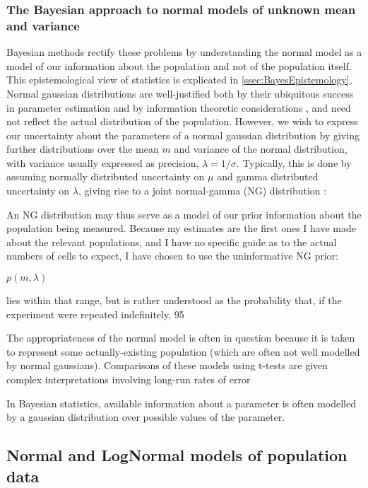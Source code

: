 \subsubsection{The Bayesian approach to normal models of unknown mean and variance}
Bayesian methods rectify these problems by understanding the normal model as a model of our information about the population and not of the population itself. This epistemological view of statistics is explicated in \autoref{ssec:BayesEpistemology}. Normal gaussian distributions are well-justified both by their ubiquitous success in parameter estimation and by information theoretic considerations \cite{Jaynes2003}, and need not reflect the actual distribution of the population. However, we wish to express our uncertainty about the parameters of a normal gaussian distribution by giving further distributions over the mean $m$ and variance of the normal distribution, with variance usually expressed as precision, $\lambda = 1/\sigma$. Typically, this is done by  assuming normally distributed uncertainty on $\mu$ and gamma distributed uncertainty on $\lambda$, giving rise to a joint normal-gamma (NG) distribution \cite{Bernardo2000}:

An NG distribution may thus serve as a model of our prior information about the population being measured. Because my estimates are the first ones I have made about the relevant populations, and I have no specific guide as to the actual numbers of cells to expect, I have chosen to use the uninformative NG prior:

$p(m,\lambda)$

lies within that range, but is rather understood as the probability that, if the experiment were repeated indefinitely, 95

The appropriateness of the normal model is often in question because it is taken to represent some actually-existing population (which are often not well modelled by normal gaussians). Comparisons of these models using t-tests are given complex interpretations involving long-run rates of error

In Bayesian statistics, available information about a parameter is often modelled by a gaussian distribution over possible values of the parameter.

\subsection{Normal and LogNormal models of population data}
\label{ssec:NormalModels}


